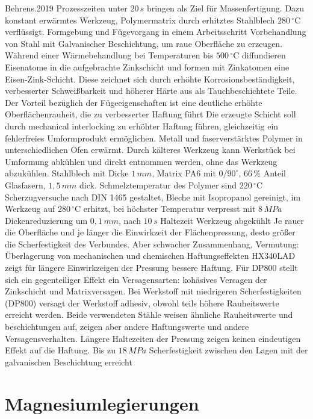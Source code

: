 Behrens.2019
Prozesszeiten unter $20 \, s$ bringen als Ziel für Massenfertigung.
Dazu konstant erwärmtes Werkzeug, Polymermatrix durch erhitztes Stahlblech $280 \, ^\circ \text{C}$ verflüssigt.
Formgebung und Fügevorgang in einem Arbeitsschritt
Vorbehandlung von Stahl mit Galvanischer Beschichtung, um raue Oberfläche zu erzeugen.
Während einer Wärmebehandlung bei Temperaturen bis $500 \, ^\circ \text{C}$ diffundieren Eisenatome in die aufgebrachte Zinkschicht und formen mit Zinkatomen eine Eisen-Zink-Schicht.
Diese zeichnet sich durch erhöhte Korrosionsbeständigkeit, verbesserter Schweißbarkeit und höherer Härte aus als Tauchbeschichtete Teile.
Der Vorteil bezüglich der Fügeeigenschaften ist eine deutliche erhöhte Oberflächenrauheit, die zu verbesserter Haftung führt \cite{XXX 12,13 nach Behrens.2019}
Die erzeugte Schicht soll durch mechanical interlocking zu erhöhter Haftung führen, gleichzeitig ein fehlerfreies Umformprodukt ermöglichen.
Metall und faserverstärktes Polymer in unterschiedlichen Öfen erwärmt.
Durch kälteres Werkzeug kann Werkstück bei Umformung abkühlen und direkt entnommen werden, ohne das Werkzeug abzukühlen.
Stahlblech mit Dicke $1 \, mm$, Matrix PA6 mit $0/90 ^\circ$, $66\,\%$ Anteil Glasfasern, $1,5 \, mm$ dick. Schmelztemperatur des Polymer sind $220 \, ^\circ \text{C}$
Scherzugversuche nach DIN 1465 gestaltet, Bleche mit Isopropanol gereinigt, im Werkzeug auf $280 \, ^\circ\text{C}$ erhitzt, bei höchster Temperatur verpresst mit $8 \, MPa$
Dickenreduzierung um $0,1 \, mm$, nach $10 \, s$ Haltezeit Werkzeug abgekühlt
Je rauer die Oberfläche und je länger die Einwirkzeit der Flächenpressung, desto größer die Scherfestigkeit des Verbundes.
Aber schwacher Zusammenhang, Vermutung: Überlagerung von mechanischen und chemischen Haftungseffekten
HX340LAD zeigt für längere Einwirkzeigen der Pressung bessere Haftung.
Für DP800 stellt sich ein gegenteiliger Effekt ein
Versagensarten: kohäsives Versagen der Zinkschicht und Matrixversagen.
Bei Werkstoff mit niedrigeren Scherfestigkeiten (DP800) versagt der Werkstoff adhesiv, obwohl teils höhere Rauheitswerte erreicht werden.
Beide verwendeten Stähle weisen ähnliche Rauheitswerte und beschichtungen auf, zeigen aber andere Haftungswerte und andere Versagensverhalten.
Längere Haltezeiten der Pressung zeigen keinen eindeutigen Effekt auf die Haftung.
Bis zu $18 \, MPa$ Scherfestigkeit zwischen den Lagen mit der galvanischen Beschichtung erreicht


\section{Magnesiumlegierungen}\label{sec:Mg}

